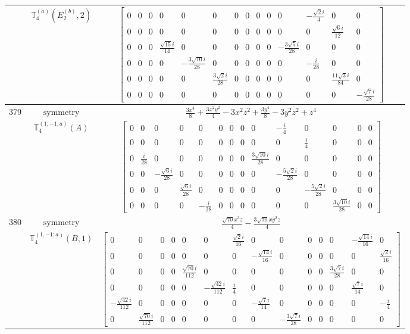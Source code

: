 \documentclass[fleqn,8pt,landscape]{jsarticle}
\begin{document}
\begin{longtable}{ccc}
$  $ & $ \mathbb{T}_{4}^{(a)}(E_{2}^{(b)},2) $ & $ \begin{bmatrix} 0 & 0 & 0 & 0 & 0 & 0 & 0 & 0 & 0 & 0 & 0 & - \frac{\sqrt{2} i}{4} & 0 & 0 \\ 0 & 0 & 0 & 0 & 0 & 0 & 0 & 0 & 0 & 0 & 0 & 0 & \frac{\sqrt{6} i}{12} & 0 \\ 0 & 0 & 0 & \frac{\sqrt{15} i}{14} & 0 & 0 & 0 & 0 & 0 & 0 & - \frac{3 \sqrt{5} i}{28} & 0 & 0 & 0 \\ 0 & 0 & 0 & 0 & - \frac{3 \sqrt{10} i}{28} & 0 & 0 & 0 & 0 & 0 & 0 & - \frac{i}{28} & 0 & 0 \\ 0 & 0 & 0 & 0 & 0 & \frac{3 \sqrt{2} i}{28} & 0 & 0 & 0 & 0 & 0 & 0 & \frac{11 \sqrt{3} i}{84} & 0 \\ 0 & 0 & 0 & 0 & 0 & 0 & 0 & 0 & 0 & 0 & 0 & 0 & 0 & - \frac{\sqrt{7} i}{28} \end{bmatrix} $ \\ \hline
$ 379 $ & $ \text{symmetry} $ & $ \frac{3 x^{4}}{8} + \frac{3 x^{2} y^{2}}{4} - 3 x^{2} z^{2} + \frac{3 y^{4}}{8} - 3 y^{2} z^{2} + z^{4} $ \\
$  $ & $ \mathbb{T}_{4}^{(1,-1;a)}(A) $ & $ \begin{bmatrix} 0 & 0 & 0 & 0 & 0 & 0 & 0 & 0 & 0 & - \frac{i}{4} & 0 & 0 & 0 & 0 \\ 0 & 0 & 0 & 0 & 0 & 0 & 0 & 0 & 0 & 0 & \frac{i}{4} & 0 & 0 & 0 \\ 0 & \frac{i}{28} & 0 & 0 & 0 & 0 & 0 & 0 & \frac{3 \sqrt{10} i}{28} & 0 & 0 & 0 & 0 & 0 \\ 0 & 0 & - \frac{\sqrt{6} i}{28} & 0 & 0 & 0 & 0 & 0 & 0 & - \frac{5 \sqrt{2} i}{28} & 0 & 0 & 0 & 0 \\ 0 & 0 & 0 & \frac{\sqrt{6} i}{28} & 0 & 0 & 0 & 0 & 0 & 0 & - \frac{5 \sqrt{2} i}{28} & 0 & 0 & 0 \\ 0 & 0 & 0 & 0 & - \frac{i}{28} & 0 & 0 & 0 & 0 & 0 & 0 & \frac{3 \sqrt{10} i}{28} & 0 & 0 \end{bmatrix} $ \\ \hline
$ 380 $ & $ \text{symmetry} $ & $ \frac{\sqrt{70} x^{3} z}{4} - \frac{3 \sqrt{70} x y^{2} z}{4} $ \\
$  $ & $ \mathbb{T}_{4}^{(1,-1;a)}(B,1) $ & $ \begin{bmatrix} 0 & 0 & 0 & 0 & 0 & 0 & \frac{\sqrt{2} i}{16} & 0 & 0 & 0 & 0 & 0 & - \frac{\sqrt{14} i}{16} & 0 \\ 0 & 0 & 0 & 0 & 0 & 0 & 0 & - \frac{\sqrt{14} i}{16} & 0 & 0 & 0 & 0 & 0 & \frac{\sqrt{2} i}{16} \\ 0 & 0 & 0 & 0 & \frac{\sqrt{70} i}{112} & 0 & 0 & 0 & 0 & 0 & 0 & \frac{3 \sqrt{7} i}{28} & 0 & 0 \\ 0 & 0 & 0 & 0 & 0 & - \frac{\sqrt{42} i}{112} & \frac{i}{4} & 0 & 0 & 0 & 0 & 0 & \frac{\sqrt{7} i}{14} & 0 \\ - \frac{\sqrt{42} i}{112} & 0 & 0 & 0 & 0 & 0 & 0 & - \frac{\sqrt{7} i}{14} & 0 & 0 & 0 & 0 & 0 & - \frac{i}{4} \\ 0 & \frac{\sqrt{70} i}{112} & 0 & 0 & 0 & 0 & 0 & 0 & - \frac{3 \sqrt{7} i}{28} & 0 & 0 & 0 & 0 & 0 \end{bmatrix} $ \\ \hline

\end{longtable}
\end{document}
